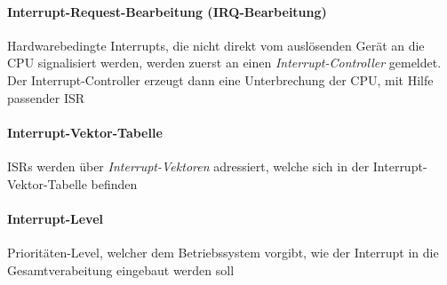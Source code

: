 \documentclass[11pt,a4paper,landscape]{article}
\begin{document}
\begin{multicols*}{3}
	\paragraph{Interrupt-Request-Bearbeitung (IRQ-Bearbeitung)} Hardwarebedingte Interrupts, die nicht direkt vom auslösenden Gerät an die CPU signalisiert werden, werden zuerst an einen \textit{Interrupt-Controller} gemeldet. Der Interrupt-Controller erzeugt dann eine Unterbrechung der CPU, mit Hilfe passender ISR
	\paragraph{Interrupt-Vektor-Tabelle} ISRs werden über \textit{Interrupt-Vektoren} adressiert, welche sich in der Interrupt-Vektor-Tabelle befinden
	\paragraph{Interrupt-Level} Prioritäten-Level, welcher dem Betriebssystem vorgibt, wie der Interrupt in die Gesamtverabeitung eingebaut werden soll

\end{multicols*}
\end{document}

